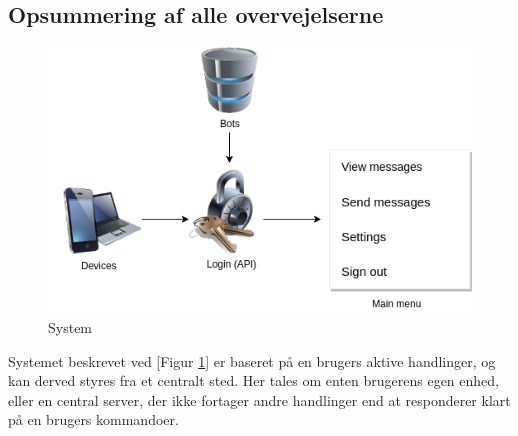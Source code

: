 


\subsection{Opsummering af alle overvejelserne}
\begin{figure}[H]
    \centering
    \includegraphics[width=0.70\linewidth]{Projectdoc/Assets/Illustrationer/simple-system.png}
    \caption{System}
    \label{fig:sysdiagram}
\end{figure}

Systemet beskrevet ved [Figur \ref{fig:sysdiagram}] er baseret på en brugers aktive handlinger, og kan derved styres fra et centralt sted. Her tales om enten brugerens egen enhed, eller en central server, der ikke fortager andre handlinger end at responderer klart på en brugers kommandoer.

